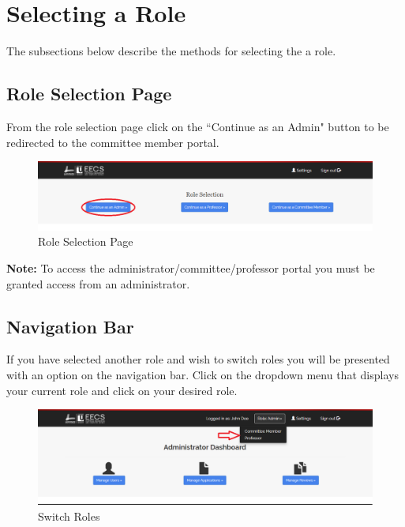 \documentclass[fontsize=12pt,paper=letter,twoside]{scrartcl}
\begin{document}
\clearpage

\section{Selecting a Role}
The subsections below describe the methods for selecting the a role.

\subsection{Role Selection Page}
From the role selection page click on the ``Continue as an Admin" button to be redirected to the committee member portal.

\begin{figure}[!htb]
\begin{center}
\includegraphics[width=.99\textwidth]{images/auth.png}
\end{center}
\caption{Role Selection Page}
\label{fig:role_selection1}
\end{figure}

\noindent \textbf{Note:} To access the administrator/committee/professor portal you must be granted access from an administrator.

\subsection{Navigation Bar}
If you have selected another role and wish to switch roles you will be presented with an option on the navigation bar. Click on the dropdown menu that displays your current role and click on your desired role.
\begin{figure}[!htb]
\begin{center}
\includegraphics[width=.9\textwidth]{images/role-selection2.png}
\end{center}
\caption{Switch Roles}
\label{fig:role_selection2}
\end{figure}
\end{document}
